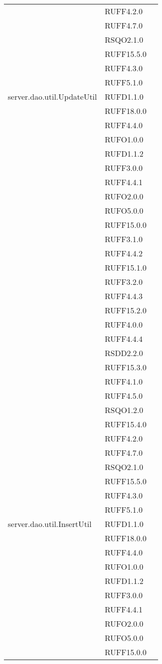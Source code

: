 \begin{center}
\begin{longtable}{lp{}l}
 & RUFF4.2.0 \\
 & RUFF4.7.0 \\
 & RSQO2.1.0 \\
 & RUFF15.5.0 \\
 & RUFF4.3.0 \\
 & RUFF5.1.0 \\
server.dao.util.UpdateUtil & RUFD1.1.0 \\
 & RUFF18.0.0 \\
 & RUFF4.4.0 \\
 & RUFO1.0.0 \\
 & RUFD1.1.2 \\
 & RUFF3.0.0 \\
 & RUFF4.4.1 \\
 & RUFO2.0.0 \\
 & RUFO5.0.0 \\
 & RUFF15.0.0 \\
 & RUFF3.1.0 \\
 & RUFF4.4.2 \\
 & RUFF15.1.0 \\
 & RUFF3.2.0 \\
 & RUFF4.4.3 \\
 & RUFF15.2.0 \\
 & RUFF4.0.0 \\
 & RUFF4.4.4 \\
 & RSDD2.2.0 \\
 & RUFF15.3.0 \\
 & RUFF4.1.0 \\
 & RUFF4.5.0 \\
 & RSQO1.2.0 \\
 & RUFF15.4.0 \\
 & RUFF4.2.0 \\
 & RUFF4.7.0 \\
 & RSQO2.1.0 \\
 & RUFF15.5.0 \\
 & RUFF4.3.0 \\
 & RUFF5.1.0 \\
server.dao.util.InsertUtil & RUFD1.1.0 \\
 & RUFF18.0.0 \\
 & RUFF4.4.0 \\
 & RUFO1.0.0 \\
 & RUFD1.1.2 \\
 & RUFF3.0.0 \\
 & RUFF4.4.1 \\
 & RUFO2.0.0 \\
 & RUFO5.0.0 \\
 & RUFF15.0.0 \\

\end{longtable}
\end{center}
